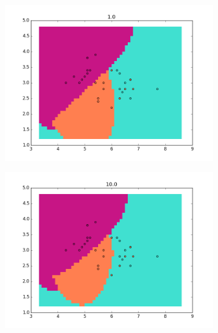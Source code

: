 \documentclass{article}
\begin{document}
\begin{center}
\begin{figure}
\centering  
        \begin{subfigure}[b]{0.48\textwidth}
                \centering
                \includegraphics[width=\linewidth]{figure_13}
        \end{subfigure}\hfill
        \begin{subfigure}[b]{0.48\textwidth}
                \centering
                \includegraphics[width=\linewidth]{figure_14}
        \end{subfigure}
        \label{fig:8}
\end{figure}


\end{center}
\end{document}
